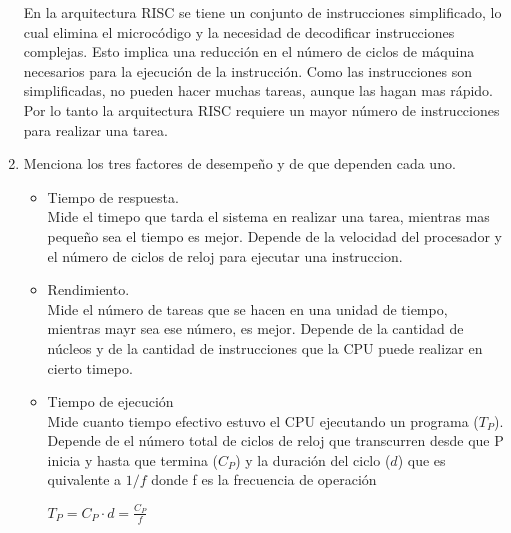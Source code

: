 \documentclass[a4paper,12pt]{article}
\begin{document}
\begin{enumerate}[label=\textcolor{teal}{\textbf{\arabic*.}}]
            En la arquitectura RISC se tiene un conjunto de instrucciones simplificado, lo cual elimina el microcódigo y la necesidad de
            decodificar instrucciones complejas. Esto implica una reducción en el número
            de ciclos de máquina necesarios para la ejecución de la instrucción. Como las instrucciones son simplificadas, 
            no pueden hacer muchas tareas, aunque las hagan mas rápido.\\

            Por lo tanto la arquitectura RISC requiere un mayor número de instrucciones para realizar una tarea.\\
        

        \item Menciona los tres factores de desempeño y de que dependen cada uno.
      
            \begin{itemize}
                \item Tiempo de respuesta.\\
                    Mide el timepo que tarda el sistema en realizar una tarea, mientras mas pequeño sea el tiempo es mejor. Depende de la velocidad del procesador y el número de ciclos de reloj para ejecutar una instruccion.
                \item Rendimiento.\\
                    Mide el número de tareas que se hacen en una unidad de tiempo, mientras mayr sea ese número, es mejor. Depende de la cantidad de núcleos y de la cantidad de instrucciones que la CPU puede realizar en cierto timepo.
                \item Tiempo de ejecución\\
                    Mide cuanto tiempo efectivo estuvo el CPU ejecutando un programa ($T_P$). Depende de el número total de ciclos de reloj que transcurren desde que P inicia y hasta que
                    termina ($C_P$) y la duración del ciclo ($d$) que es quivalente a $1/f$ donde f es la frecuencia de operación \\
                    \begin{center}
                        $T_P = {C_P} \cdot {d} =\frac{C_P}{f}$
                    \end{center}
            \end{itemize}



\end{enumerate}
\end{document}
